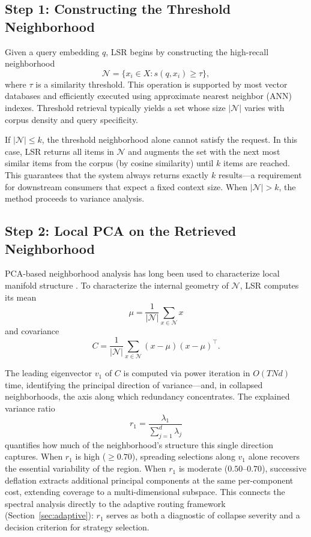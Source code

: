 \documentclass{article}
\begin{document}
\subsection{Step 1: Constructing the Threshold Neighborhood}

Given a query embedding $q$, LSR begins by constructing the high-recall neighborhood
\begin{equation}
    \mathcal{N} = \{ x_i \in X : s(q, x_i) \geq \tau \},
\end{equation}
where $\tau$ is a similarity threshold. This operation is supported by most vector databases and efficiently executed using approximate nearest neighbor (ANN) indexes. Threshold retrieval typically yields a set whose size $|\mathcal{N}|$ varies with corpus density and query specificity.

If $|\mathcal{N}| \le k$, the threshold neighborhood alone cannot satisfy the request. In this case, LSR returns all items in $\mathcal{N}$ and augments the set with the next most similar items from the corpus (by cosine similarity) until $k$ items are reached. This guarantees that the system always returns exactly $k$ results---a requirement for downstream consumers that expect a fixed context size. When $|\mathcal{N}| > k$, the method proceeds to variance analysis.

\subsection{Step 2: Local PCA on the Retrieved Neighborhood}
PCA-based neighborhood analysis has long been used to characterize local manifold structure \cite{sproull1991pca}.
To characterize the internal geometry of $\mathcal{N}$, LSR computes its mean
\begin{equation}
    \mu = \frac{1}{|\mathcal{N}|} \sum_{x \in \mathcal{N}} x
\end{equation}
and covariance
\begin{equation}
    C = \frac{1}{|\mathcal{N}|} \sum_{x \in \mathcal{N}} (x - \mu)(x - \mu)^\top.
\end{equation}

The leading eigenvector $v_1$ of $C$ is computed via power iteration in $O(TNd)$ time, identifying the principal direction of variance---and, in collapsed neighborhoods, the axis along which redundancy concentrates. The explained variance ratio
\begin{equation}
    r_1 = \frac{\lambda_1}{\sum_{j=1}^{d} \lambda_j}
\end{equation}
quantifies how much of the neighborhood's structure this single direction captures. When $r_1$ is high ($\geq 0.70$), spreading selections along $v_1$ alone recovers the essential variability of the region. When $r_1$ is moderate ($0.50$--$0.70$), successive deflation extracts additional principal components at the same per-component cost, extending coverage to a multi-dimensional subspace. This connects the spectral analysis directly to the adaptive routing framework (Section~\ref{sec:adaptive}): $r_1$ serves as both a diagnostic of collapse severity and a decision criterion for strategy selection.
\end{document}
